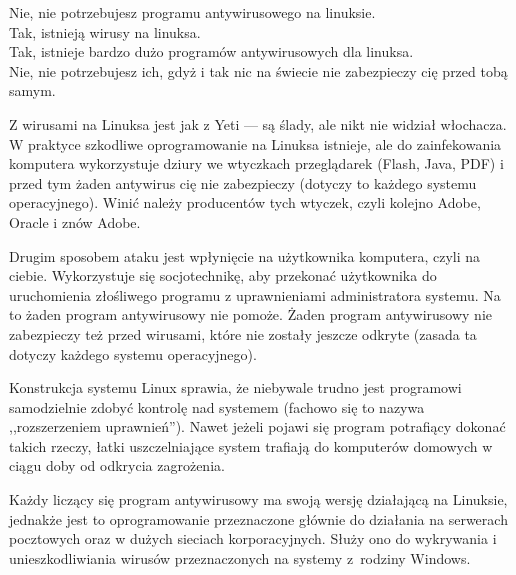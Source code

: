 \noindent \textcolor{ubuntu_orange}{Nie}, nie potrzebujesz programu antywirusowego na linuksie.\\
\textcolor{ubuntu_orange}{Tak}, istnieją wirusy na linuksa.\\
\textcolor{ubuntu_orange}{Tak}, istnieje bardzo dużo programów antywirusowych dla linuksa.\\
\textcolor{ubuntu_orange}{Nie}, nie potrzebujesz ich, gdyż i tak nic na świecie nie zabezpieczy cię przed tobą samym.

Z wirusami na Linuksa jest jak z Yeti --- są ślady, ale nikt nie widział włochacza. W praktyce szkodliwe oprogramowanie na Linuksa istnieje, ale do zainfekowania komputera wykorzystuje dziury we wtyczkach przeglądarek (Flash, Java, PDF) i przed tym żaden antywirus cię nie zabezpieczy (dotyczy to każdego systemu operacyjnego). Winić należy producentów tych wtyczek, czyli kolejno Adobe, Oracle i znów Adobe.

Drugim sposobem ataku jest wpłynięcie na użytkownika komputera, czyli na ciebie. Wykorzystuje się socjotechnikę, aby przekonać użytkownika do uruchomienia złośliwego programu z uprawnieniami administratora systemu. Na to żaden program antywirusowy nie pomoże. Żaden program antywirusowy nie zabezpieczy też przed wirusami, które nie zostały jeszcze odkryte (zasada ta dotyczy każdego systemu operacyjnego).

Konstrukcja systemu Linux sprawia, że niebywale trudno jest programowi samodzielnie zdobyć kontrolę nad systemem (fachowo się to nazywa ,,rozszerzeniem uprawnień''). Nawet jeżeli pojawi się program potrafiący dokonać takich rzeczy, łatki uszczelniające system trafiają do komputerów domowych w ciągu doby od odkrycia zagrożenia.

Każdy liczący się program antywirusowy ma swoją wersję działającą na Linuksie, jednakże jest to oprogramowanie przeznaczone głównie do działania na serwerach pocztowych oraz w dużych sieciach korporacyjnych. Służy ono do wykrywania i unieszkodliwiania wirusów przeznaczonych na systemy z~rodziny Windows.

